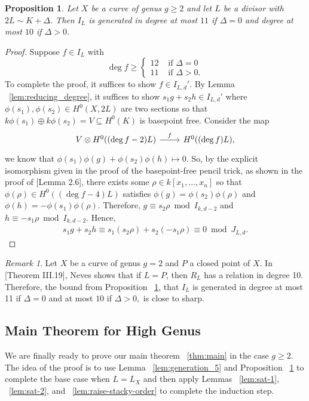 \documentclass{amsart}
\theoremstyle{plain}
\newtheorem{prop}[thm]{Proposition}
\theoremstyle{definition}
\theoremstyle{remark}
\newtheorem{rem}[thm]{Remark}
\numberwithin{equation}{section}
\newcommand\ssec{\subsection}
\begin{document}
\begin{prop}
\label{prop:relation_11}
Let $X$ be a curve of genus $g \geq 2$ and let $L$ be a divisor with $2L \sim K + \Delta$. Then $I_L$ is generated in degree at most $11$ if $\Delta = 0$ and degree at most $10$ if $\Delta > 0$.
\end{prop}
\begin{proof}
Suppose $f \in I_L$ with 
$$
\deg f \geq \begin{cases}
	12 &\text{ if }\Delta = 0\\
	11 &\text{ if }\Delta > 0.
\end{cases}$$
To complete the proof, it suffices to show $f \in I_{L,d}'$. By Lemma ~\ref{lem:reducing_degree}, it suffices to show $s_1g+s_2h \in I_{L,d}'$ where $\phi(s_1),\phi(s_2) \in H^0(X,2L)$ are two sections so that $k\phi(s_1) \oplus k \phi(s_2) = V \subseteq H^0(K)$ is basepoint free. Consider the map
$$\begin{tikzcd}
V \otimes H^0((\deg f - 2)L) \ar {r}{f} & H^0((\deg f)L),
\end{tikzcd}$$
we know that $\phi(s_1)\phi(g) + \phi(s_2) \phi(h) \mapsto 0.$
So, by the explicit isomorphism given in the proof of the basepoint-free pencil trick, as shown in the proof of \cite{saint-donat:proj}[Lemma 2.6], there exists some $\rho \in k[x_1, \ldots, x_n]$ so that $\phi(\rho) \in H^0((\deg f - 4)L)$ satisfies $\phi(g) = \phi(s_2)\phi(\rho)$ and $\phi(h) = -\phi(s_1)\phi(\rho).$ Therefore, $g \equiv s_2 \rho \bmod I_{k,d-2}$ and $h \equiv -s_1 \rho \bmod I_{k,d-2}$. Hence,
\begin{align*}
	s_1g + s_2h \equiv s_1(s_2\rho) + s_2(-s_1 \rho) \equiv 0 \bmod J_{L,d}.
\end{align*}
\end{proof}

\begin{rem}
\label{rem:relations_generation_ten}
Let $X$ be a curve of genus $g = 2$ and $P$ a closed point of $X$. In \cite{neves:halfcan}[Theorem III.19], Neves shows that if $L = P$, then $R_L$ has a
relation in degree 10. Therefore, the bound from Proposition
~\ref{prop:relation_11}, that $I_L$ is generated in degree at most
11 if $\Delta = 0$ and at most $10$ if $\Delta > 0,$ is close to
sharp.
\end{rem}



\ssec{Main Theorem for High Genus}
\label{ssec:g-high-main}

We are finally ready to prove our main theorem ~\ref{thm:main} in the case $g \geq 2$. The idea of the proof is to use Lemma ~\ref{lem:generation_5} and Proposition ~\ref{prop:relation_11} to complete the base case when $L = L_X$ and then apply Lemmas ~\ref{lem:sat-1}, ~\ref{lem:sat-2}, and ~\ref{lem:raise-stacky-order} to complete the induction step.
\end{document}
